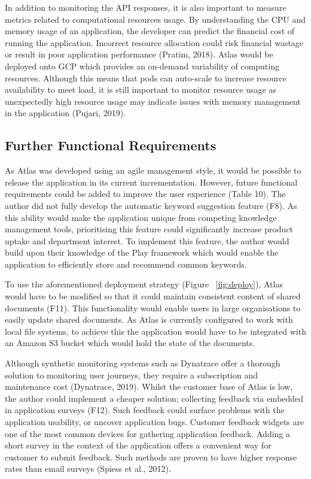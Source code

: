 \documentclass{article}
\begin{document}
In addition to monitoring the API responses, it is also important to measure metrics related to computational resources usage. By understanding the CPU and memory usage of an application, the developer can predict the financial cost of running the application. Incorrect resource allocation could risk financial wastage or result in poor application performance (Pratim, 2018). Atlas would be deployed onto GCP which provides an on-demand variability of computing resources. Although this means that pods can auto-scale to increase resource availability to meet load, it is still important to monitor resource usage as unexpectedly high resource usage may indicate issues with memory management in the application (Pujari, 2019).

\subsection{Further Functional Requirements}

As Atlas was developed using an agile management style, it would be possible to release the application in its current incrementation. However, future functional requirements could be added to improve the user experience (Table 10). The author did not fully develop the automatic keyword suggestion feature (F8). As this ability would make the application unique from competing knowledge management tools, prioritising this feature could significantly increase product uptake and department interest. To implement this feature, the author would build upon their knowledge of the Play framework which would enable the application to efficiently store and recommend common keywords.

To use the aforementioned deployment strategy (Figure ~\ref{fig:deploy}), Atlas would have to be modified so that it could maintain consistent content of shared documents (F11). This functionality would enable users in large organisations to easily update shared documents. As Atlas is currently configured to work with local file systems, to achieve this the application would have to be integrated with an Amazon S3 bucket which would hold the state of the documents.

Although synthetic monitoring systems such as Dynatrace offer a thorough solution to monitoring user journeys, they require a subscription and maintenance cost (Dynatrace, 2019). Whilst the customer base of Atlas is low, the author could implement a cheaper solution; collecting feedback via embedded in application surveys (F12). Such feedback could surface problems with the application usability, or uncover application bugs. Customer feedback widgets are one of the most common devices for gathering application feedback. Adding a short survey in the context of the application offers a convenient way for customer to submit feedback. Such methods are proven to have higher response rates than email surveys (Spiess et al., 2012). 
\end{document}
